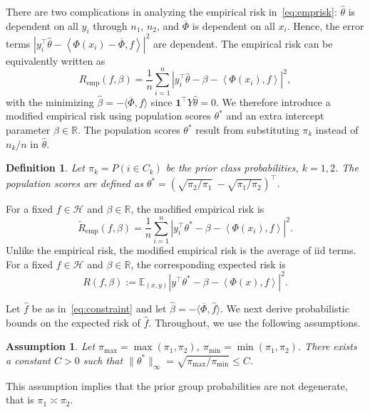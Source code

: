 \documentclass[twoside, onecolumn]{article}
\def\R{\mathbb{R}}
\def\one{\mathbf{1}}
\def\Hcal{\mathcal{H}}
\def\Hcal{\mathcal{H}}
\def\Score{\widehat{\theta}}
\newtheorem{definition}{Definition}
\newtheorem{assumption}{Assumption}
\begin{document}
There are two complications in analyzing the empirical risk in~\eqref{eq:emprisk}: $\Score$ is dependent on all $y_i$ through $n_1$, $n_2$, and $\overline \Phi$ is dependent on all $x_i$. Hence, the error terms $|y_i^{\top}\Score-\left<\Phi(x_i)-\overline{\Phi},f\right>|^{2}$ are dependent. The empirical risk can be equivalently written as
$$
R_{\text{emp}}(f, \beta) = \frac{1}{n}\sum_{i=1}^{n}|y_i^{\top}\Score-\beta -\left<\Phi(x_i),f\right>|^{2},
$$
with the minimizing $\widehat \beta =-\langle{\overline{\Phi}, f\rangle}$ since $\one^{\top}Y\widehat \theta = 0$. %
We therefore introduce a modified empirical risk using population scores $\theta^*$ and an extra intercept parameter $\beta\in \R$. The population scores $\theta^*$ result from substituting $\pi_k$ instead of $n_k/n$ in $\widehat \theta$.
\begin{definition}\label{eq:PopulationScores}
Let $\pi_k = P(i\in C_k)$ be the prior class probabilities, $k=1,2$. The \emph{population scores} are defined as
$\theta^*=(
\sqrt{\pi_2/\pi_1}\ -\sqrt{\pi_1/\pi_2}
)^{\top}$.
\end{definition}
For a fixed $f\in\Hcal$ and $\beta\in\R$, the modified empirical risk is
$$
\widetilde{R}_{\text{emp}}(f,\beta)=\frac{1}{n}\sum_{i=1}^{n}|y_i^{\top}\theta^*-\beta-\left<\Phi(x_i),f\right>|^{2}.
$$
Unlike the empirical risk, the modified empirical risk is the average of iid terms. For a fixed $f\in \Hcal$ and $\beta \in \R$, the corresponding expected risk is
$$
R(f,\beta):=\mathbb{E}_{(x,y)}|y^{\top}\theta^*-\beta-\left<\Phi(x),f\right>|^{2}.
$$

Let $\widehat f$ be as in~\eqref{eq:constraint} and let $\widehat \beta = -\langle \overline{\Phi}, \widehat f\rangle$. We next derive probabilistic bounds on the expected risk of $\widehat f$. Throughout, we use the following assumptions.

\begin{assumption}\label{assump:ScoreBound} Let $\pi_{\max} = \max(\pi_1, \pi_2)$, $\pi_{\min} = \min(\pi_1, \pi_2)$. 
There exists a constant $C>0$ such that $\|\theta^*\|_\infty = \sqrt{\pi_{\max}/\pi_{\min}}\leq C$.
\end{assumption}
This assumption implies that the prior group probabilities are not degenerate, that is $\pi_1 \asymp \pi_2$. 
\end{document}
